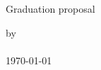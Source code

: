 \thispagestyle{empty}

\begin{titlepage}
    \begin{center}
        \large  
        \hfill
        \vfill

        \begingroup
            \color{Maroon}\spacedallcaps{\myTitle}
        \endgroup
        
        \vspace{5cm}
        
        Graduation proposal 
        \bigskip
        
        by\\
        \bigskip
        \myName\\
        \bigskip
        \today\\

        \vfill

    \end{center}  
\end{titlepage}  










